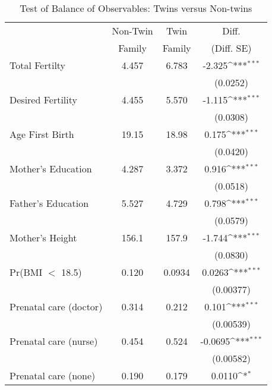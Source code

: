\begin{table}[htbp]\centering
\def\sym#1{\ifmmode^{#1}\else\(^{#1}\)\fi}
\caption{Test of Balance of Observables: Twins versus Non-twins \label{TWINtab:comp}}
\vspace{5mm}\begin{tabular}{l*{1}{ccc}}
\toprule\toprule & Non-Twin & Twin & Diff.\\
                    &        Family&        Family&      (Diff. SE)         \\
\midrule
Total Fertilty      &       4.457&       6.783&      -2.325\sym{***}\\
                    &            &            &    (0.0252)         \\
Desired Fertility   &       4.455&       5.570&      -1.115\sym{***}\\
                    &            &            &    (0.0308)         \\
Age First Birth     &       19.15&       18.98&       0.175\sym{***}\\
                    &            &            &    (0.0420)         \\
Mother's Education  &       4.287&       3.372&       0.916\sym{***}\\
                    &            &            &    (0.0518)         \\
Father's Education  &       5.527&       4.729&       0.798\sym{***}\\
                    &            &            &    (0.0579)         \\
Mother's Height     &       156.1&       157.9&      -1.744\sym{***}\\
                    &            &            &    (0.0830)         \\
Pr(BMI $<$ 18.5)    &       0.120&      0.0934&      0.0263\sym{***}\\
                    &            &            &   (0.00377)         \\
Prenatal care (doctor)&       0.314&       0.212&       0.101\sym{***}\\
                    &            &            &   (0.00539)         \\
Prenatal care (nurse)&       0.454&       0.524&     -0.0695\sym{***}\\
                    &            &            &   (0.00582)         \\
Prenatal care (none)&       0.190&       0.179&      0.0110\sym{*}  \\

\end{tabular}
\end{table}
